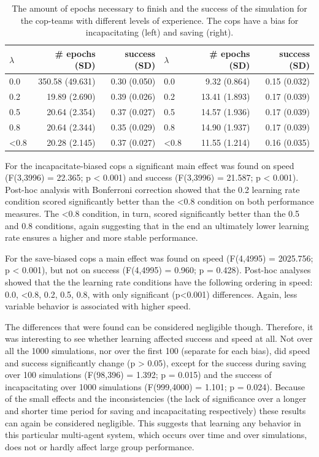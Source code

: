\begin{table}
\begin{center}
\begin{tabular}{l r  r | l r  r}
$\lambda$ &  \# epochs (SD) & success (SD) & $\lambda$ &  \# epochs (SD) & success (SD)\\
\hline
0.0 & 350.58 (49.631) & 0.30 (0.050) & 0.0 & 9.32 (0.864) & 0.15 (0.032)\\
0.2 & 19.89 (2.690) & 0.39 (0.026) & 0.2 & 13.41 (1.893) & 0.17 (0.039)\\
0.5 & 20.64 (2.354) & 0.37 (0.027) & 0.5 & 14.57 (1.936) & 0.17 (0.039)\\
0.8 & 20.64 (2.344) & 0.35 (0.029) & 0.8 & 14.90 (1.937) & 0.17 (0.039)\\
<0.8 & 20.28 (2.145) & 0.37 (0.027) & <0.8 & 11.55 (1.214) & 0.16 (0.035)\\
\hline
\end{tabular}
\caption{The amount of epochs necessary to finish and the success of the simulation for the cop-teams with different levels of experience. The cops have a bias for incapacitating (left) and saving (right).}
\label{tab:ResultsBias}
\end{center}
\end{table}
For the incapacitate-biased cops a significant main effect was found on speed (F(3,3996) = 22.365; p < 0.001) and success (F(3,3996) = 21.587; p < 0.001). Post-hoc analysis with Bonferroni correction showed that the 0.2 learning rate condition scored significantly better than the <0.8 condition on both performance measures. The <0.8 condition, in turn, scored significantly better than the 0.5 and 0.8 conditions, again suggesting that in the end an ultimately lower learning rate ensures a higher and more stable performance. 

For the save-biased cops a main effect was found on speed (F(4,4995) = 2025.756; p < 0.001), but not on success (F(4,4995) = 0.960; p = 0.428). Post-hoc analyses showed that the the learning rate conditions have the following ordering in speed: 0.0, <0.8, 0.2, 0.5, 0.8, with only significant (p<0.001) differences. Again, less variable behavior is associated with higher speed. 

The differences that were found can be considered negligible though. Therefore, it was interesting to see whether learning affected success and speed at all. Not over all the 1000 simulations, nor over the first 100 (separate for each bias), did speed and success significantly change (p > 0.05), except for the success during saving over 100 simulations (F(98,396) = 1.392; p = 0.015) and the success of incapacitating over 1000 simulations (F(999,4000) = 1.101; p = 0.024). Because of the small effects and the inconsistencies (the lack of significance over a longer and shorter time period for saving and incapacitating respectively) these results can again be considered negligible. This suggests that learning any behavior in this particular multi-agent system, which occurs over time and over simulations, does not or hardly affect large group performance. 


